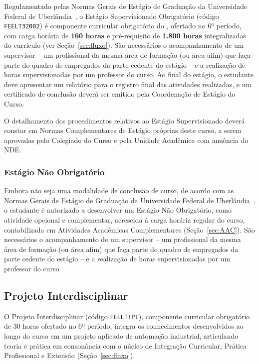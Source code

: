 Regulamentado pelas Normas Gerais de Estágio de Graduação da Universidade Federal de Uberlândia~\cite{ufu_congrad_93_2023}, o Estágio Supervisionado Obrigatório (código \texttt{FEELT32002}) é componente curricular obrigatório do \ppccurso, ofertado no 6º período, com carga horária de \textbf{160 horas} e pré-requisito de \textbf{1.800 horas} integralizadas do currículo (ver Seção~\ref{sec:fluxo}). São necessários o acompanhamento de um supervisor -- um profissional da mesma área de formação (ou área afim) que faça parte do quadro de empregados da parte cedente do estágio -- e a realização de horas supervisionadas por um professor do curso. Ao final do estágio, o estudante deve apresentar um relatório para o registro final das atividades realizadas, e um certificado de conclusão deverá ser emitido pela Coordenação de Estágio do Curso.

O detalhamento dos procedimentos relativos ao Estágio Supervisionado deverá constar em Normas Complementares de Estágio próprias deste curso, a serem aprovadas pelo Colegiado do Curso e pela Unidade Acadêmica com anuência do NDE.

\subsubsection{Estágio Não Obrigatório}

Embora não seja uma modalidade de conclusão de curso, de acordo com as Normas Gerais de Estágio de Graduação da Universidade Federal de Uberlândia~\cite{ufu_congrad_93_2023}, o estudante é autorizado a desenvolver um Estágio Não Obrigatório, como atividade opcional e complementar, acrescida à carga horária regular do curso, contabilizada em Atividades Acadêmicas Complementares (Seção~\ref{sec:AAC}). São necessários o acompanhamento de um supervisor -- um profissional da mesma área de formação (ou área afim) que faça parte do quadro de empregados da parte cedente do estágio -- e a realização de horas supervisionadas por um professor do curso.

\subsection{Projeto Interdisciplinar}

O Projeto Interdisciplinar (código \texttt{FEELT!PI}), componente curricular obrigatório de 30 horas ofertado no 6º período, integra os conhecimentos desenvolvidos ao longo do curso em um projeto aplicado de automação industrial, articulando teoria e prática em consonância com o núcleo de Integração Curricular, Prática Profissional e Extensão (Seção~\ref{sec:fluxo}).

